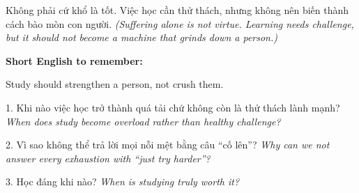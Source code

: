 \begin{baihoc}
Không phải cứ khổ là tốt. Việc học cần thử thách, nhưng không nên biến thành cách bào mòn con người.
\textit{(Suffering alone is not virtue. Learning needs challenge, but it should not become a machine that grinds down a person.)}
\end{baihoc}

\begin{ghinhoanh}
\textbf{Short English to remember:}

Study should strengthen a person, not crush them.

\end{ghinhoanh}

\begin{tuhocnhanh}
1. Khi nào việc học trở thành quá tải chứ không còn là thử thách lành mạnh? \textit{When does study become overload rather than healthy challenge?}

2. Vì sao không thể trả lời mọi nỗi mệt bằng câu “cố lên”? \textit{Why can we not answer every exhaustion with “just try harder”?}

3. Học đáng khi nào? \textit{When is studying truly worth it?}
\end{tuhocnhanh}
\ngancach

